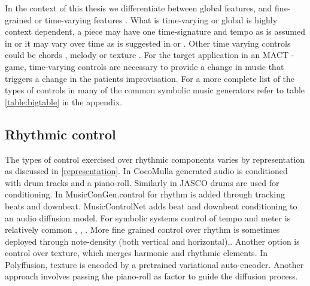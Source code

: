 In the context of this thesis we differentiate between global features, and fine-grained or time-varying features \cite{Rütte_figaro_2023}. What is time-varying or global is highly context dependent, a piece may have one time-signature and tempo as is assumed in \cite{Lu_Xu_Kang_Yu_Xing_Tan_Bian_MuseCoco_2023} or it may vary over time as is suggested in \cite{Rütte_figaro_2023} or \cite{Huang_Yang_remi_pop_transformer_2020}. Other time varying controls could be chords \cite{Rütte_figaro_2023}\cite{Wu_Donahue_musicontrolnet_2023}\cite{Lan_Hsiao_Cheng_Yang_musicongen_2024}\cite{Min_Jiang_Xia_Zhao_polyffusion_2023}, melody \cite{copet2023simple}\cite{Min_Jiang_Xia_Zhao_polyffusion_2023} or texture \cite{Min_Jiang_Xia_Zhao_polyffusion_2023}. For the target application in an MACT - game, time-varying controls are necessary to provide a change in music that triggers a change in the patients improvisation.
For a more complete list of the types of controls in many of the common symbolic music generators refer to table \ref{table:bigtable}
in the appendix.

\subsection{Rhythmic control} \label{section:rhytmic_weight}
The types of control exercised over rhythmic components varies by representation as discussed in \ref{representation}. In CocoMulla \cite{Lin_cocomulla_2024} generated audio is conditioned with drum tracks and a piano-roll. Similarly in JASCO\cite{Tal_jasco} drums are used for conditioning. In MusicConGen.\cite{Lan_Hsiao_Cheng_Yang_musicongen_2024}control for rhythm is added through tracking beats and downbeat. MusicControlNet\cite{Wu_Donahue_musicontrolnet_2023} adds beat and downbeat conditioning to an audio diffusion model.
For symbolic systems control of tempo and meter is relatively common \cite{Rütte_figaro_2023}, \cite{Huang_Yang_remi_pop_transformer_2020}, \cite{Lu_Xu_Kang_Yu_Xing_Tan_Bian_MuseCoco_2023}. More fine grained control over rhythm is sometimes deployed through note-density (both vertical and horizontal)\cite{Rütte_figaro_2023},\cite{Huang_rule_diffusion_2024}.  Another option is control over texture, which merges harmonic and rhythmic elements. In Polyffusion\cite{Min_Jiang_Xia_Zhao_polyffusion_2023}, texture is encoded by a pretrained variational auto-encoder\cite{Wang_vae_chord_rhythm_2020}. Another approach \cite{Zhu_Liu_Jiang_Zheng_texture_2024} involves passing the piano-roll as factor to guide the diffusion process.




